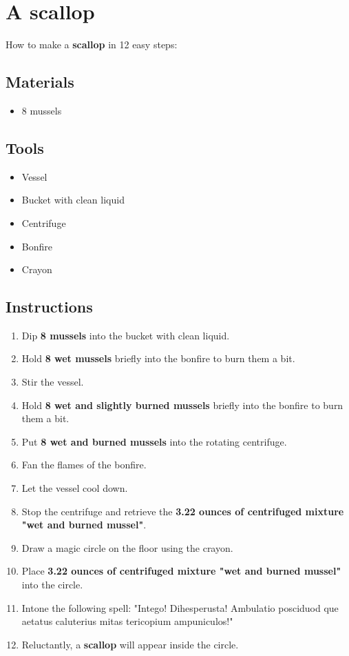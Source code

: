 \documentclass{article}
\begin{document}
\section{A scallop}How to make a \textbf{scallop} in 12 easy steps:

\subsection{Materials}\begin{itemize}
\item 
8 mussels
\end{itemize}
\subsection{Tools}\begin{itemize}
\item 
Vessel
\item 
Bucket with clean liquid
\item 
Centrifuge
\item 
Bonfire
\item 
Crayon
\end{itemize}
\subsection{Instructions}\begin{enumerate}
\item 
Dip \textbf{8 mussels} into the bucket with clean liquid.
\item 
Hold \textbf{8 wet mussels} briefly into the bonfire to burn them a bit.
\item 
Stir the vessel.
\item 
Hold \textbf{8 wet and slightly burned mussels} briefly into the bonfire to burn them a bit.
\item 
Put \textbf{8 wet and burned mussels} into the rotating centrifuge.
\item 
Fan the flames of the bonfire.
\item 
Let the vessel cool down.
\item 
Stop the centrifuge and retrieve the \textbf{3.22 ounces of centrifuged mixture "wet and burned mussel"}.
\item 
Draw a magic circle on the floor using the crayon.
\item 
Place \textbf{3.22 ounces of centrifuged mixture "wet and burned mussel"} into the circle.
\item 
Intone the following spell: "Intego! Dihesperusta! Ambulatio posciduod que aetatus caluterius mitas tericopium ampuniculos!"
\item 
Reluctantly, a \textbf{scallop} will appear inside the circle.
\end{enumerate}
\newpage
\end{document}
